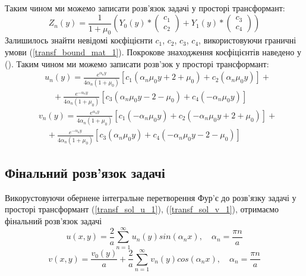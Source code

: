 Таким чином ми можемо записати розв'язок задачі у просторі трансформант:
\begin{equation}
    Z_n(y) = \frac{1}{1 + \mu_0} \left( Y_0(y) * \begin{pmatrix} c_1 \\ c_2 \end{pmatrix} +  Y_1(y) * \begin{pmatrix} c_3 \\ c_4 \end{pmatrix}  \right)
\end{equation}
Залишилось знайти невідомі коєфіцієнти $c_1$, $c_2$, $c_3$, $c_4$, використовуючи граничні умови (\ref{transf_bound_mat_1}).
Покрокове знаходження коєфіцієнтів наведено у ().
Таким чином ми можемо записати розв'зок у просторі трансформант:
\begin{align}\label{transf_sol_u_1}
    &u_n(y) = \frac{e^{\alpha_n y}}{4 \alpha_n (1 + \mu_0)} \left[c_1 (\alpha_n \mu_0 y + 2 + \mu_0) + c_2 (\alpha_n \mu_0 y) \right] + \nonumber \\
    &\quad + \frac{e^{-\alpha_n y}}{4 \alpha_n (1 + \mu_0)} \left[c_3 (\alpha_n \mu_0 y - 2 - \mu_0) + c_4 (-\alpha_n \mu_0 y)\right]
\end{align}
\begin{align}\label{transf_sol_v_1}
    &v_n(y) = \frac{e^{\alpha_n y}}{4 \alpha_n (1 + \mu_0)} \left[c_1 (-\alpha_n \mu_0 y) + c_2 (-\alpha_n \mu_0 y + 2 + \mu_0) \right] + \nonumber \\
    &\quad + \frac{e^{-\alpha_n y}}{4 \alpha_n (1 + \mu_0)} \left[c_3 (\alpha_n \mu_0 y) + c_4 (-\alpha_n \mu_0 y - 2 - \mu_0)\right]
\end{align}

\subsection{Фінальний розв'язок задачі}
Викорустовуючи обернене інтегральне перетворення Фур'є до розв'язку задачі у просторі трансформант
(\ref{transf_sol_u_1}), (\ref{transf_sol_v_1}), отримаємо фінальний розв'язок задачі
\begin{equation}
    u(x,y) = \frac{2}{a} \sum_{n=1}^{\infty} u_n(y) sin(\alpha_n x), \quad \alpha_n = \frac{\pi n}{a}
\end{equation}
\begin{equation}
    v(x,y) = \frac{v_0(y)}{a} + \frac{2}{a} \sum_{n=1}^{\infty} v_n(y) cos(\alpha_n x), \quad \alpha_n = \frac{\pi n}{a}
\end{equation}

